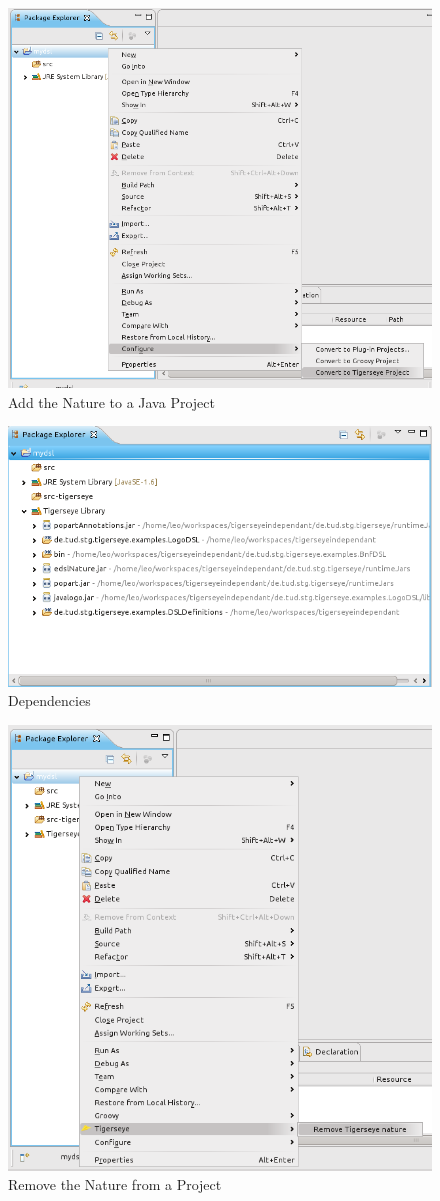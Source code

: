 	\begin{figure}
	  \centering
	  \includegraphics[width=.5\textwidth,keepaspectratio=true]{./pics/convert_to_tigerseye.png}
	  \caption{Add the \tiger Nature to a Java Project}
	  \label{fig:add_tiger_nature}
	\end{figure}
	
	\begin{figure}
	  \centering
	  \includegraphics[width=.5\textwidth,keepaspectratio=true]{./pics/tigerseye_dependencies.png}
	  \caption{\tiger Dependencies}
	  \label{fig:tiger_added_dependencies}
	\end{figure}
	
	\begin{figure}
	  \centering
	  \includegraphics[width=.5\textwidth,keepaspectratio=true]{./pics/remove_tigerseye_nature.png}
	  \caption{Remove the \tiger Nature from a Project}
	  \label{fig:remove_tiger_nature}
	\end{figure}
	
